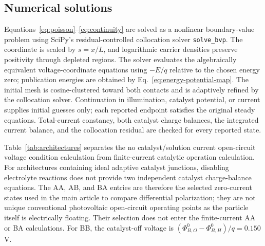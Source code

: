 \documentclass[11pt]{article}
\begin{document}
\subsection{Numerical solutions}

Equations~\ref{eq:poisson}--\ref{eq:continuity} are solved as a nonlinear boundary-value problem using SciPy's residual-controlled collocation solver \texttt{solve\_bvp}.\cite{kierzenka2001} The coordinate is scaled by $s=x/L$, and logarithmic carrier densities preserve positivity through depleted regions. The solver evaluates the algebraically equivalent voltage-coordinate equations using $-E/q$ relative to the chosen energy zero; publication energies are obtained by Eq.~\ref{eq:energy-potential-map}. The initial mesh is cosine-clustered toward both contacts and is adaptively refined by the collocation solver. Continuation in illumination, catalyst potential, or current supplies initial guesses only; each reported endpoint satisfies the original steady equations. Total-current constancy, both catalyst charge balances, the integrated current balance, and the collocation residual are checked for every reported state.

Table~\ref{tab:architectures} separates the no catalyst/solution current open-circuit voltage condition calculation from finite-current catalytic operation calculation. For architectures containing ideal adaptive catalyst junctions, disabling electrolyte reactions does not provide two independent catalyst charge-balance equations. The AA, AB, and BA entries are therefore the selected zero-current states used in the main article to compare differential polarization; they are not unique conventional photovoltaic open-circuit operating points as the particle itself is electrically floating. Their selection does not enter the finite-current AA or BA calculations. For BB, the catalyst-off voltage is $(\Phi_{B,O}^0-\Phi_{B,H}^0)/q=0.150$ V.
\end{document}
